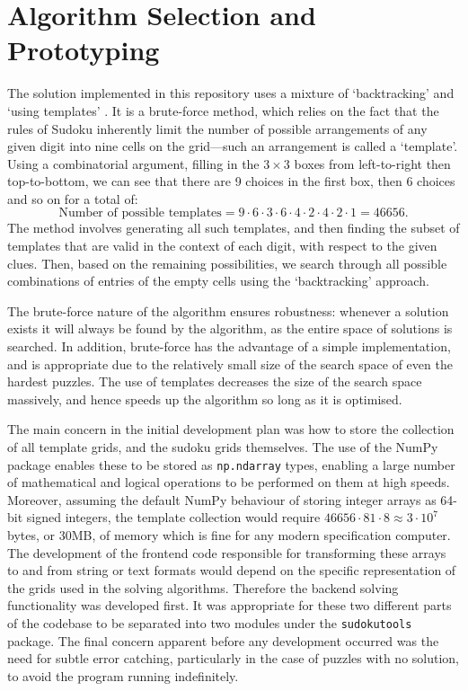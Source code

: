 \documentclass[12pt]{article}
\begin{document}
\section*{Algorithm Selection and Prototyping}

The solution implemented in this repository uses a mixture of `backtracking' and `using templates' \cite{wiki1}.
It is a brute-force method, which relies on the fact that the rules of Sudoku inherently limit the number of possible arrangements of any given digit into nine cells on the grid---such an arrangement is called a `template'.
Using a combinatorial argument, filling in the $3\times3$ boxes from left-to-right then top-to-bottom, we can see that there are 9 choices in the first box, then 6 choices and so on for a total of:
\[
    \text{Number of possible templates} = 9\cdot6\cdot3\cdot6\cdot4\cdot2\cdot4\cdot2\cdot1 = 46656.
\]
The method involves generating all such templates, and then finding the subset of templates that are valid in the context of each digit, with respect to the given clues.
Then, based on the remaining possibilities, we search through all possible combinations of entries of the empty cells using the `backtracking' approach.

The brute-force nature of the algorithm ensures robustness: whenever a solution exists it will always be found by the algorithm, as the entire space of solutions is searched.
In addition, brute-force has the advantage of a simple implementation, and is appropriate due to the relatively small size of the search space of even the hardest puzzles.
The use of templates decreases the size of the search space massively, and hence speeds up the algorithm so long as it is optimised.

The main concern in the initial development plan was how to store the collection of all template grids, and the sudoku grids themselves.
The use of the NumPy package enables these to be stored as \texttt{np.ndarray} types, enabling a large number of mathematical and logical operations to be performed on them at high speeds.
Moreover, assuming the default NumPy behaviour of storing integer arrays as 64-bit signed integers, the template collection would require $46656\cdot81\cdot8\approx3\cdot10^7$ bytes, or 30MB, of memory which is fine for any modern specification computer.
The development of the frontend code responsible for transforming these arrays to and from string or text formats would depend on the specific representation of the grids used in the solving algorithms.
Therefore the backend solving functionality was developed first.
It was appropriate for these two different parts of the codebase to be separated into two modules under the \texttt{sudokutools} package.
The final concern apparent before any development occurred was the need for subtle error catching, particularly in the case of puzzles with no solution, to avoid the program running indefinitely.
\end{document}
